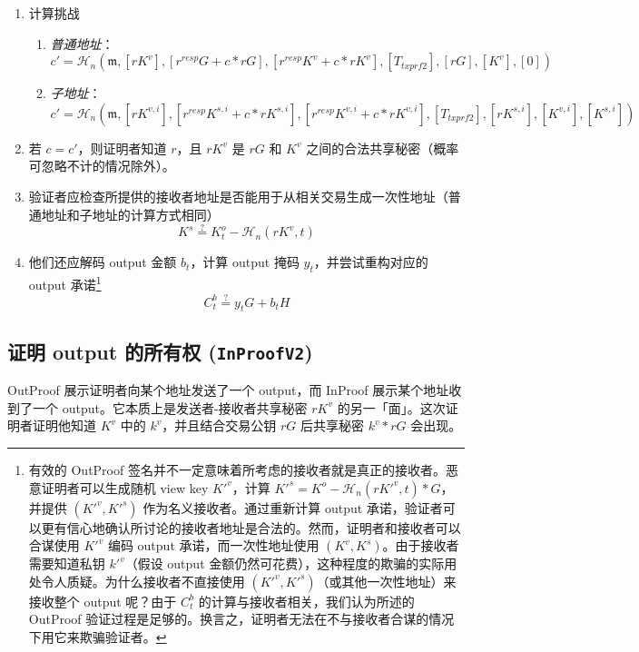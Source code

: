 \begin{enumerate}
    \item 计算挑战
    \begin{enumerate}
        \item {\em 普通地址}：\vspace{.145cm}
	    \[c' = \mathcal{H}_n(\mathfrak{m},[rK^v], [r^{resp} G + c*r G], [r^{resp} K^v + c*r K^v], [T_{txprf2}], [rG], [K^v], [0])\]
	    \item {\em 子地址}：\vspace{.16cm}
	    \[c' = \mathcal{H}_n(\mathfrak{m},[rK^{v,i}], [r^{resp} K^{s,i} + c*r K^{s,i}], [r^{resp} K^{v,i} + c*r K^{v,i}], [T_{txprf2}], [rK^{s,i}], [K^{v,i}], [K^{s,i}])\]
    \end{enumerate}{}
    \item 若 $c = c'$，则证明者知道 $r$，且 $rK^v$ 是 $r G$ 和 $K^v$ 之间的合法共享秘密（概率可忽略不计的情况除外）。
    \item 验证者应检查所提供的接收者地址是否能用于从相关交易生成一次性地址（普通地址和子地址的计算方式相同）
    \[K^s \stackrel{?}{=} K^o_t - \mathcal{H}_n(r K^v,t)\]
    \item 他们还应解码 output 金额 $b_t$，计算 output 掩码 $y_t$，并尝试重构对应的 output 承诺\footnote{有效的 OutProof 签名并不一定意味着所考虑的接收者就是真正的接收者。恶意证明者可以生成随机 view key $K'^v$，计算 $K'^s = K^o - \mathcal{H}_n(rK'^v,t)*G$，并提供 $(K'^v,K'^s)$ 作为名义接收者。通过重新计算 output 承诺，验证者可以更有信心地确认所讨论的接收者地址是合法的。然而，证明者和接收者可以合谋使用 $K'^v$ 编码 output 承诺，而一次性地址使用 $(K^v,K^s)$。由于接收者需要知道私钥 $k'^v$（假设 output 金额仍然可花费），这种程度的欺骗的实际用处令人质疑。为什么接收者不直接使用 $(K'^v,K'^s)$（或其他一次性地址）来接收整个 output 呢？由于 $C^b_t$ 的计算与接收者相关，我们认为所述的 OutProof 验证过程是足够的。换言之，证明者无法在不与接收者合谋的情况下用它来欺骗验证者。}\vspace{.175cm}
    \[C^b_t \stackrel{?}{=} y_t G + b_t H\]
\end{enumerate}{}


\subsection{证明 output 的所有权 ({\tt InProofV2})}
\label{subsec:proofs-output-ownership-inproof}

OutProof 展示证明者向某个地址发送了一个 output，而 InProof 展示某个地址收到了一个 output。它本质上是发送者-接收者共享秘密 $r K^v$ 的另一「面」。这次证明者证明他知道 $K^v$ 中的 $k^v$，并且结合交易公钥 $r G$ 后共享秘密 $k^v*r G$ 会出现。

